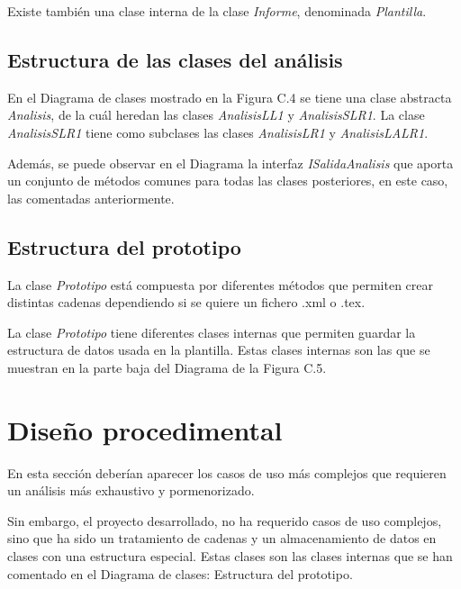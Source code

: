 Existe también una clase interna de la clase \textit{Informe}, denominada \textit{Plantilla}.


\subsection{Estructura de las clases del análisis}

En el Diagrama de clases mostrado en la Figura C.4 se tiene una clase abstracta \textit{Analisis}, de la cuál heredan las clases \textit{AnalisisLL1} y \textit{AnalisisSLR1}. La clase \textit{AnalisisSLR1} tiene como subclases las clases \textit{AnalisisLR1} y \textit{AnalisisLALR1}.

Además, se puede observar en el Diagrama la interfaz \textit{ISalidaAnalisis} que aporta un conjunto de métodos comunes para todas las clases posteriores, en este caso, las comentadas anteriormente.


\subsection{Estructura del prototipo}

La clase \textit{Prototipo} está compuesta por diferentes métodos que permiten crear distintas cadenas dependiendo si se quiere un fichero .xml o .tex.

La clase \textit{Prototipo} tiene diferentes clases internas que permiten guardar la estructura de datos usada en la plantilla. Estas clases internas son las que se muestran en la parte baja del Diagrama de la Figura C.5.


\section{Diseño procedimental}

En esta sección deberían aparecer los casos de uso más complejos que requieren un análisis más exhaustivo y pormenorizado.

Sin embargo, el proyecto desarrollado, no ha requerido casos de uso complejos, sino que ha sido un tratamiento de cadenas y un almacenamiento de datos en clases con una estructura especial. Estas clases son las clases internas que se han comentado en el Diagrama de clases: Estructura del prototipo.

